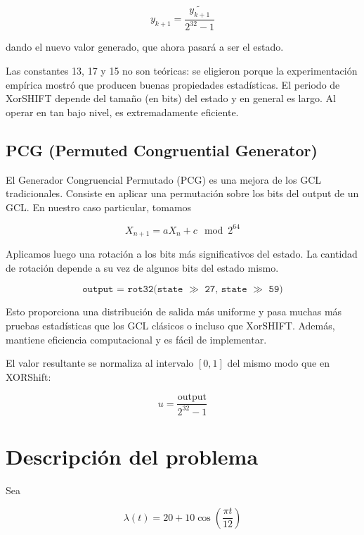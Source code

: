 \documentclass[a4paper, 12pt]{article}
\begin{document}
\begin{equation*}
    y_{k+1} = \frac{\widetilde{y_{k+1}}}{2^{32} - 1}
\end{equation*}

dando el nuevo valor generado, que ahora pasará a ser el estado.

Las constantes 13, 17 y 15 no son teóricas: se eligieron porque la
experimentación empírica mostró que producen buenas propiedades estadísticas. El
periodo de XorSHIFT depende del tamaño (en bits) del estado y en general es
largo. Al operar en tan bajo nivel, es extremadamente eficiente. 


\subsection{PCG (Permuted Congruential Generator)}

El Generador Congruencial Permutado (PCG) es una mejora de los GCL
tradicionales. Consiste en aplicar una permutación sobre los bits del output de
un GCL. En nuestro caso particular, tomamos

\[
X_{n+1} = aX_n + c \mod 2^{64}
\]

Aplicamos luego una rotación a los bits más significativos del estado. La
cantidad de rotación depende a su vez de algunos bits del estado mismo.

\begin{equation*}
\texttt{output = rot32(state $\gg$ 27, state $\gg$ 59)}
\end{equation*}

Esto proporciona una distribución de salida más uniforme y pasa muchas más
pruebas estadísticas que los GCL clásicos o incluso que XorSHIFT. Además,
mantiene eficiencia computacional y es fácil de implementar. 

El valor resultante se normaliza al intervalo $[0, 1]$ del mismo modo que en
XORShift:

\begin{equation*}
u = \frac{\text{output}}{2^{32} - 1}
\end{equation*}


\section{Descripción del problema}

Sea 

\begin{equation}
    \lambda(t) = 20 + 10\cos \left( \frac{\pi t}{12} \right) 
\end{equation}
\end{document}
